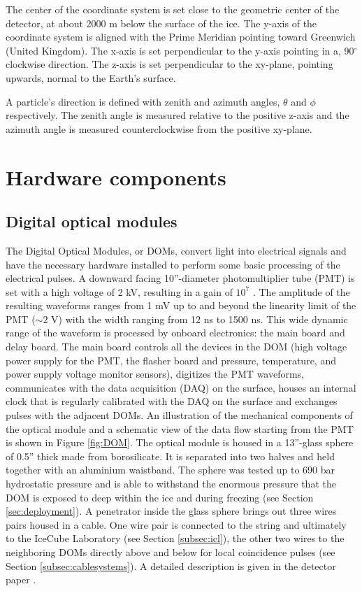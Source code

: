 \noindent The center of the coordinate system is set close to the geometric center of the detector, at about 2000 m below the surface of the ice. The y-axis of the coordinate system is aligned with the Prime Meridian pointing toward Greenwich (United Kingdom). The x-axis is set perpendicular to the y-axis pointing in a, 90$^\circ$ clockwise direction. The z-axis is set perpendicular to the xy-plane, pointing upwards, normal to the Earth's surface.

A particle's direction is defined with zenith and azimuth angles, $\theta$ and $\phi$ respectively. The zenith angle is measured relative to the positive z-axis and the azimuth angle is measured counterclockwise from the positive xy-plane.



\section{Hardware components}
\subsection{Digital optical modules}
\label{subsec:doms}
The Digital Optical Modules, or DOMs, convert light into electrical signals and have the necessary hardware installed to perform some basic processing of the electrical pulses. A downward facing 10''-diameter photomultiplier tube (PMT) is set with a high voltage of 2 kV, resulting in a gain of $10^7$ \cite{Aartsen:2016nxy}. The amplitude of the resulting waveforms ranges from 1 mV up to and beyond the linearity limit of the PMT ($\sim2$ V) with the width ranging from 12 ns to 1500 ns. This wide dynamic range of the waveform is processed by onboard electronics: the main board and delay board. The main board controls all the devices in the DOM (high voltage power supply for the PMT, the flasher board and pressure, temperature, and power supply voltage monitor sensors), digitizes the PMT waveforms, communicates with the data acquisition (DAQ) on the surface, houses an internal clock that is regularly calibrated with the DAQ on the surface and exchanges pulses with the adjacent DOMs.
An illustration of the mechanical components of the optical module and a schematic view of the data flow starting from the PMT is shown in Figure \ref{fig:DOM}. The optical module is housed in a 13''-glass sphere of 0.5'' thick made from borosilicate. It is separated into two halves and held together with an aluminium waistband. The sphere was tested up to 690 bar hydrostatic pressure and is able to withstand the enormous pressure that the DOM is exposed to deep within the ice and during freezing (see Section \ref{sec:deployment}). A penetrator inside the glass sphere brings out three wires pairs housed in a cable. One wire pair is connected to the string and ultimately to the IceCube Laboratory (see Section \ref{subsec:icl}), the other two wires to the neighboring DOMs directly above and below for local coincidence pulses (see Section \ref{subsec:cablesystems}). A detailed description is given in the detector paper \cite{Aartsen:2016nxy}.

